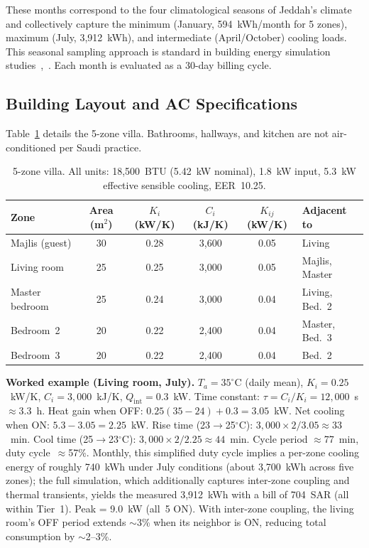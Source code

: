 \documentclass[12pt,a4paper]{article}
\begin{document}
\noindent These months correspond to the four climatological seasons of Jeddah's climate and collectively capture the minimum (January, 594~kWh/month for 5 zones), maximum (July, 3{,}912~kWh), and intermediate (April/October) cooling loads. This seasonal sampling approach is standard in building energy simulation studies~\cite{ref17},~\cite{ref28}. Each month is evaluated as a 30-day billing cycle.

\subsection{Building Layout and AC Specifications}

Table~\ref{tab:zones} details the 5-zone villa. Bathrooms, hallways, and kitchen are not air-conditioned per Saudi practice.

\begin{table}[H]
\centering
\caption{5-zone villa. All units: 18{,}500~BTU (5.42~kW nominal), 1.8~kW input, 5.3~kW effective sensible cooling, EER~10.25.}
\label{tab:zones}
\begin{tabular*}{\textwidth}{@{\extracolsep{\fill}}lccccl@{}}
\toprule
\textbf{Zone} & \textbf{Area} (m$^2$) & $K_i$ (kW/K) & $C_i$ (kJ/K) & $K_{ij}$ (kW/K) & \textbf{Adjacent to} \\
\midrule
Majlis (guest) & 30 & 0.28 & 3{,}600 & 0.05 & Living \\
Living room & 25 & 0.25 & 3{,}000 & 0.05 & Majlis, Master \\
Master bedroom & 25 & 0.24 & 3{,}000 & 0.04 & Living, Bed.~2 \\
Bedroom~2 & 20 & 0.22 & 2{,}400 & 0.04 & Master, Bed.~3 \\
Bedroom~3 & 20 & 0.22 & 2{,}400 & 0.04 & Bed.~2 \\
\bottomrule
\end{tabular*}
\end{table}

\textbf{Worked example (Living room, July).} $T_a = 35^\circ$C (daily mean), $K_i = 0.25$~kW/K, $C_i = 3{,}000$~kJ/K, $Q_{\text{int}} = 0.3$~kW. Time constant: $\tau = C_i/K_i = 12{,}000$~s $\approx 3.3$~h. Heat gain when OFF: $0.25(35 - 24) + 0.3 = 3.05$~kW. Net cooling when ON: $5.3 - 3.05 = 2.25$~kW. Rise time (23$\to$25$^\circ$C): $3{,}000 \times 2 / 3.05 \approx 33$~min. Cool time (25$\to$23$^\circ$C): $3{,}000 \times 2 / 2.25 \approx 44$~min. Cycle period $\approx$77~min, duty cycle~$\approx$57\%. Monthly, this simplified duty cycle implies a per-zone cooling energy of roughly 740~kWh under July conditions (about 3{,}700~kWh across five zones); the full simulation, which additionally captures inter-zone coupling and thermal transients, yields the measured 3{,}912~kWh with a bill of 704~SAR (all within Tier~1). Peak = 9.0~kW (all~5 ON). With inter-zone coupling, the living room's OFF period extends $\sim$3\% when its neighbor is ON, reducing total consumption by $\sim$2--3\%.
\end{document}
